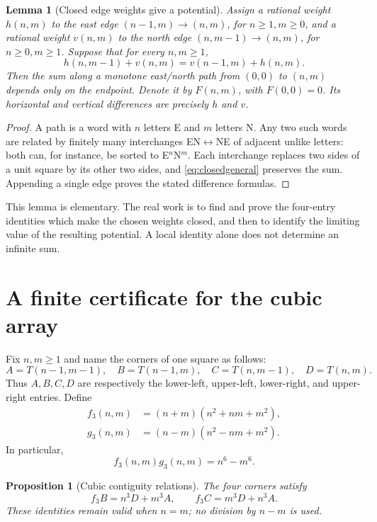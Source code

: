\documentclass[11pt]{article}
\numberwithin{equation}{section}
\newtheorem{lemma}[theorem]{Lemma}
\newtheorem{proposition}[theorem]{Proposition}
\theoremstyle{definition}
\theoremstyle{remark}
\begin{document}
\begin{lemma}[Closed edge weights give a potential]\label{lem:closed}
Assign a rational weight $h(n,m)$ to the east edge
$(n-1,m)\to(n,m)$, for $n\geq1,m\geq0$, and a rational weight $v(n,m)$
to the north edge $(n,m-1)\to(n,m)$, for $n\geq0,m\geq1$.
Suppose that for every $n,m\geq1$,
\begin{equation}\label{eq:closedgeneral}
 h(n,m-1)+v(n,m)=v(n-1,m)+h(n,m).
\end{equation}
Then the sum along a monotone east/north path from $(0,0)$ to $(n,m)$
depends only on the endpoint. Denote it by $F(n,m)$, with $F(0,0)=0$.
Its horizontal and vertical differences are precisely $h$ and $v$.
\end{lemma}
\begin{proof}
A path is a word with $n$ letters E and $m$ letters N. Any two such words
are related by finitely many interchanges EN$\leftrightarrow$NE of adjacent
unlike letters: both can, for instance, be sorted to E$^n$N$^m$.
Each interchange replaces two sides of a unit square by its other two
sides, and \eqref{eq:closedgeneral} preserves the sum. Appending a single
edge proves the stated difference formulas.
\end{proof}

This lemma is elementary. The real work is to find and prove the
four-entry identities which make the chosen weights closed, and then
to identify the limiting value of the resulting potential. A local
identity alone does not determine an infinite sum.

\section{A finite certificate for the cubic array}\label{sec:cubic}

Fix $n,m\geq1$ and name the corners of one square as follows:
\[
 A=T(n-1,m-1),\quad B=T(n-1,m),\quad
 C=T(n,m-1),\quad D=T(n,m).
\]
Thus $A,B,C,D$ are respectively the lower-left, upper-left, lower-right,
and upper-right entries. Define
\begin{align}
 f_3(n,m)&=(n+m)(n^2+nm+m^2),\label{eq:f3}\\
 g_3(n,m)&=(n-m)(n^2-nm+m^2).\label{eq:g3}
\end{align}
In particular,
\begin{equation}\label{eq:fg3}
 f_3(n,m)g_3(n,m)=n^6-m^6.
\end{equation}

\begin{proposition}[Cubic contiguity relations]\label{prop:contig3}
The four corners satisfy
\begin{equation}\label{eq:contig3}
 \boxed{f_3B=n^3D+m^3A,\qquad f_3C=m^3D+n^3A.}
\end{equation}
These identities remain valid when $n=m$; no division by $n-m$ is used.
\end{proposition}
\end{document}
